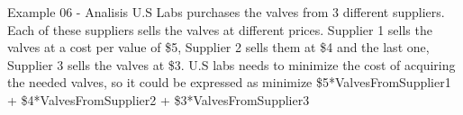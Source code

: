 \begin{frame}{Example 06 - Analisis}
U.S Labs purchases the valves from 3 different suppliers. Each of
these suppliers sells the valves at different prices. Supplier 1 sells the
valves at a cost per value of \$5, Supplier 2 sells them at \$4 and the last
one, Supplier 3 sells the valves at \$3. U.S labs needs to minimize the cost
of acquiring the needed valves, so it could be expressed as minimize
\$5*ValvesFromSupplier1 + \$4*ValvesFromSupplier2 +
\$3*ValvesFromSupplier3

\end{frame}
